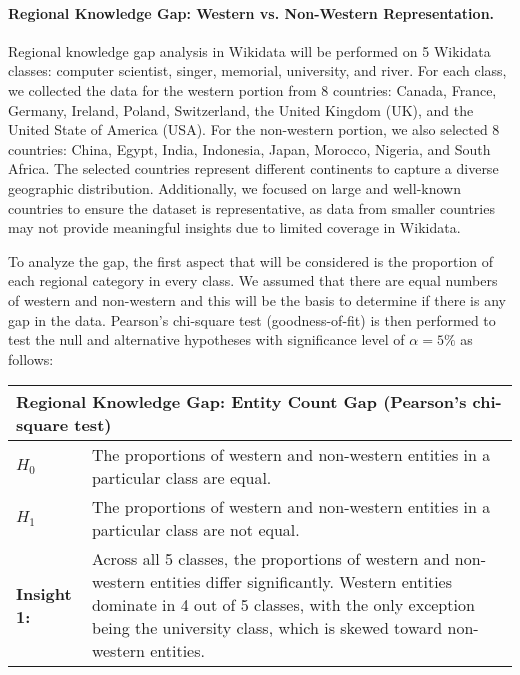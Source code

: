 \paragraph{Regional Knowledge Gap: Western vs. Non-Western Representation.}
Regional knowledge gap analysis in Wikidata will be performed on 5 Wikidata classes: computer scientist, singer, memorial, university, and river. For each class, we collected the data for the western portion from 8 countries: Canada, France, Germany, Ireland, Poland, Switzerland, the United Kingdom (UK), and the United State of America (USA). For the non-western portion, we also selected 8 countries: China, Egypt, India, Indonesia, Japan, Morocco, Nigeria, and South Africa. The selected countries represent different continents to capture a diverse geographic distribution. Additionally, we focused on large and well-known countries to ensure the dataset is representative, as data from smaller countries may not provide meaningful insights due to limited coverage in Wikidata.

To analyze the gap, the first aspect that will be considered is the proportion of each regional category in every class. We assumed that there are equal numbers of western and non-western and this will be the basis to determine if there is any gap in the data. Pearson's chi-square test (goodness-of-fit) is then performed to test the null and alternative hypotheses with significance level of \(\alpha=5\%\) as follows:



\begin{table}[h]
    \centering
    \renewcommand{\arraystretch}{1.3}
    \begin{tabular}{|l p{12cm}|} 
        \hline
        \multicolumn{2}{|l|}{\textbf{Regional Knowledge Gap: Entity Count Gap (Pearson's chi-square test)}} \\
        \hline
        \textbf{$H_0$} & The proportions of western and non-western entities in a particular class are equal. \\
        \textbf{$H_1$} & The proportions of western and non-western entities in a particular class are not equal. \\
        \hline
        \textbf{Insight 1:} & Across all 5 classes, the proportions of western and non-western entities differ significantly. Western entities dominate in 4 out of 5 classes, with the only exception being the university class, which is skewed toward non-western entities. \\
        \hline
    \end{tabular}
\end{table}

